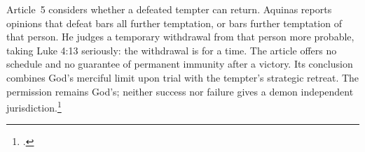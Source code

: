 Article~5 considers whether a defeated tempter can return. Aquinas reports opinions that defeat bars all further temptation, or bars further temptation of that person. He judges a temporary withdrawal from that person more probable, taking Luke 4:13 seriously: the withdrawal is for a time. The article offers no schedule and no guarantee of permanent immunity after a victory. Its conclusion combines God's merciful limit upon trial with the tempter's strategic retreat. The permission remains God's; neither success nor failure gives a demon independent jurisdiction.\footnote{.}

